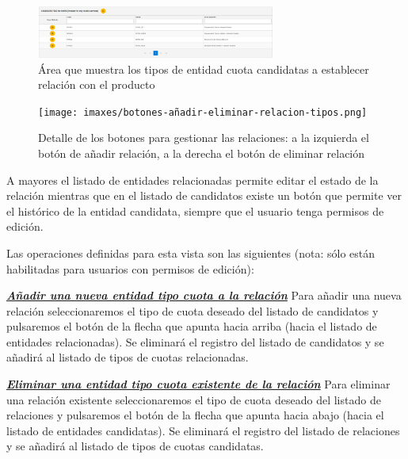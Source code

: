 \begin{figure}[H]
  \centering
  \includegraphics[width=0.70\textwidth]{imaxes/area-tipos-entidades-candidatas.png}
  \caption{Área que muestra los tipos de entidad cuota candidatas a establecer relación con el producto}
  \label{fig:area-tipos-entidades-candidatas}
\end{figure}



\begin{figure}[H]
  \centering
  \texttt{[image: imaxes/botones-añadir-eliminar-relacion-tipos.png]}
  \caption{Detalle de los botones para gestionar las relaciones: a la izquierda el botón de añadir relación, a la derecha el botón de eliminar relación}
  \label{fig:botones-añadir-eliminar-relacion-tipos}
\end{figure}

A mayores el listado de entidades relacionadas permite editar el estado de la relación mientras que en el listado de candidatos existe un botón que permite ver el histórico de la entidad candidata, siempre que el usuario tenga permisos de edición.



Las operaciones definidas para esta vista son las siguientes (nota: sólo están habilitadas para usuarios con permisos de edición):

\underline{\textsl{\textbf{Añadir una nueva entidad tipo cuota a la relación}}} \newline
Para añadir una nueva relación seleccionaremos el tipo de cuota deseado del listado de candidatos y pulsaremos el botón de la flecha que apunta hacia arriba (hacia el listado de entidades relacionadas). Se eliminará el registro del listado de candidatos y se añadirá al listado de tipos de cuotas relacionadas.


\underline{\textsl{\textbf{Eliminar una entidad tipo cuota existente de la relación}}}\newline
Para eliminar una relación existente seleccionaremos el tipo de cuota deseado del listado de relaciones y pulsaremos el botón de la flecha que apunta hacia abajo (hacia el listado de entidades candidatas). Se eliminará el registro del listado de relaciones y se añadirá al listado de tipos de cuotas candidatas.


